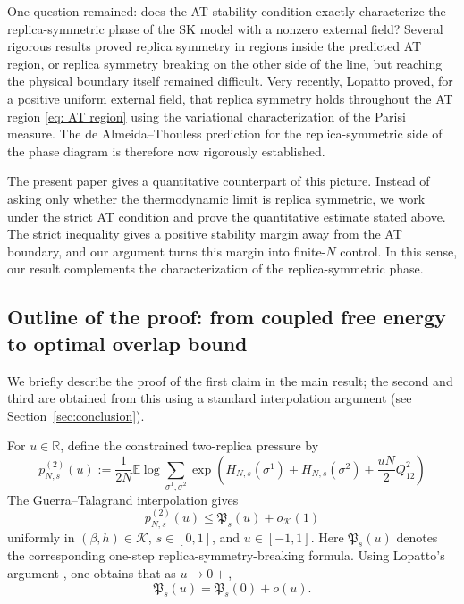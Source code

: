 \documentclass[11pt]{article}
\numberwithin{equation}{section}
\newcommand{\E}{\mathbb{E}}
\newcommand{\1}{\mathbf 1}
\newcommand{\cK}{\mathcal K}
\begin{document}
One question remained: does the AT stability condition exactly characterize the replica-symmetric phase of the SK model with a nonzero external field? Several rigorous results proved replica symmetry in regions inside the predicted AT region, or replica symmetry breaking on the other side of the line, but reaching the physical boundary itself remained difficult. Very recently, Lopatto \cite{Lopatto} proved, for a positive uniform external field, that replica symmetry holds throughout the AT region \eqref{eq: AT region} 
 using the variational characterization of the Parisi measure. The de Almeida--Thouless prediction for the replica-symmetric side of the phase diagram is therefore now rigorously established.

The present paper gives a quantitative counterpart of this picture. Instead of asking only whether the thermodynamic limit is replica symmetric, we work under the strict AT condition
 and prove the quantitative estimate stated above. The strict inequality gives a positive stability margin away from the AT boundary, and our argument turns this margin into finite-$N$ control. In this sense, our result complements the characterization of the replica-symmetric phase. 
\subsection{Outline of the proof: from coupled free energy to optimal overlap bound}
\label{subsec:proof-outline}

We briefly describe the proof of the first claim in the main result; the second and third are obtained from this using a standard interpolation argument (see Section~\ref{sec:conclusion}).

For $u \in \mathbb R$, define the constrained
two-replica pressure by
\begin{equation}
 p^{(2)}_{N,s}(u )
  :=
 \frac1{2N}\E\log
 \sum_{\sigma^1,\sigma^2}
 \exp\left(
 H_{N,s}(\sigma^1)+H_{N,s}(\sigma^2)
 +\frac{u  N}{2}Q_{12}^2\right)
\label{eq:constrained-two-replica-pressure}
\end{equation}
The Guerra--Talagrand interpolation gives
\begin{equation}
p_{N,s}^{(2)}(u )
\le
\mathfrak P_s(u )+ o_\cK(1)
\label{eq:GT-constrained-bound-outline}
\end{equation}
uniformly in $(\beta,h)\in\mathcal K$, $s\in[0,1]$, and
$u\in[-1,1]$. Here $\mathfrak P_s(u )$ denotes the
corresponding one-step replica-symmetry-breaking formula. Using Lopatto's argument \cite{Lopatto}, one obtains that as $u \to 0+$,
 \begin{equation}
\mathfrak P_s(u )
= \mathfrak P_s(0)+ o(u ).
\label{eq:global-GT-gap-outline}
\end{equation}
\end{document}
